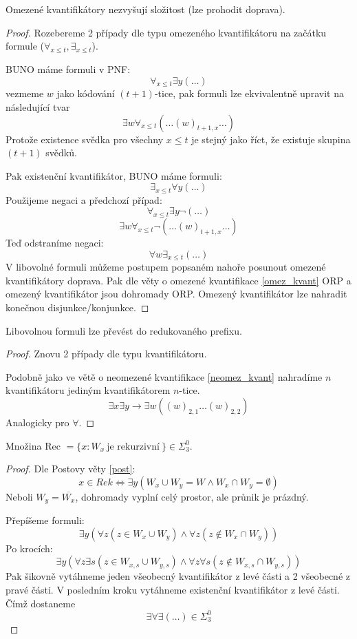 \begin{theorem}
	Omezené kvantifikátory nezvyšují složitost (lze prohodit doprava).
\end{theorem}
\begin{proof}
	Rozebereme 2 případy dle typu omezeného kvantifikátoru na začátku formule ($\forall_{x \leq t}, \exists_{x \leq t}$).

	BUNO máme formuli v PNF:
	\[ \forall_{x \leq t} \exists y (\ldots) \]
	vezmeme $w$ jako kódování $(t + 1)$-tice, pak formuli lze ekvivalentně upravit na následující tvar
	\[ \exists w \forall_{x \leq t}(\ldots (w)_{t + 1, x} \ldots)\]
	Protože existence svědka pro všechny $x \leq t$ je stejný jako říct, že existuje skupina $(t + 1)$ svědků.

	Pak existenční kvantifikátor, BUNO máme formuli:
	\[ \exists_{x \leq t} \forall y (\ldots) \]
	Použijeme negaci a předchozí případ:
	\[ \forall_{x \leq t} \exists y \neg(\ldots) \]
	\[ \exists w \forall_{x \leq t}\neg(\ldots (w)_{t + 1, x} \ldots)\]
	Teď odstraníme negaci:
	\[ \forall w \exists_{x \leq t} (\ldots)\]
	V libovolné formuli můžeme postupem popsaném nahoře posunout omezené kvantifikátory doprava.
	Pak dle věty o omezené kvantifikace \cref{omez_kvant} ORP a omezený kvantifikátor jsou dohromady ORP.
	Omezený kvantifikátor lze nahradit konečnou disjunkce/konjunkce.

\end{proof}

\begin{theorem}
	Libovolnou formuli lze převést do redukovaného prefixu.
\end{theorem}
\begin{proof}
	Znovu 2 případy dle typu kvantifikátoru.

	Podobně jako ve větě o neomezené kvantifikace \cref{neomez_kvant} nahradíme $n$ kvantifikátoru jediným kvantifikátorem $n$-tice.
	\[ \exists x \exists y \to \exists w ((w)_{2, 1} \ldots  (w)_{2, 2}) \]
	Analogicky pro $\forall$.
\end{proof}

\begin{example}
	Množina Rec $= \{ x : W_x\ \text{je rekurzivní}\ \} \in \Sigma_3^0$.
\end{example}
\begin{proof}
	Dle Postovy věty \cref{post}:
	\[ x \in Rek \iff \exists y(W_x \cup W_y = W \land W_x \cap W_y = \emptyset) \]
	Neboli $W_y = \overline{W_x}$, dohromady vyplní celý prostor, ale průnik je prázdný.

	Přepíšeme formuli:
	\[ \exists y(\forall z (z \in W_x \cup W_y) \land \forall z (z \notin W_x \cap W_y)) \]
	Po krocích:
	\[ \exists y(\forall z \exists s(z \in W_{x, s} \cup W_{y, s}) \land \forall z \forall s(z \notin W_{x, s} \cap W_{y, s})) \]
	Pak šikovně vytáhneme jeden všeobecný kvantifikátor z levé části a 2 všeobecné z pravé části.
	V posledním kroku vytáhneme existenční kvantifikátor z levé části. Čímž dostaneme
	\[ \exists \forall \exists (\ldots) \in \Sigma_3^0 \]
\end{proof}

